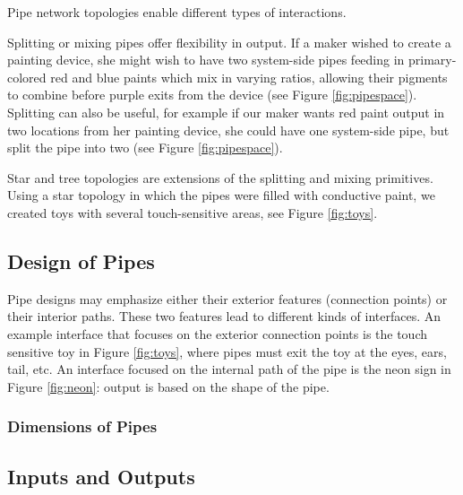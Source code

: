 Pipe network topologies enable different types of interactions.

Splitting or mixing pipes offer flexibility in output.  If a maker wished to create a painting device, she might wish to have two system-side pipes feeding in primary-colored red and blue paints which mix in varying ratios, allowing their pigments to combine before purple exits from the device (see Figure \ref{fig:pipespace}).  Splitting can also be useful, for example if our maker wants red paint output in two locations from her painting device, she could have one system-side pipe, but split the pipe into two (see Figure \ref{fig:pipespace}). 

Star and tree topologies are extensions of the splitting and mixing primitives.  Using a star topology in which the pipes were filled with conductive paint, we created toys with several touch-sensitive areas, see Figure \ref{fig:toys}. 

\subsection{Design of Pipes}

Pipe designs may emphasize either their exterior features (connection points) or their interior paths.  These two features lead to different kinds of interfaces.  An example interface that focuses on the exterior connection points is the touch sensitive toy in Figure \ref{fig:toys}, where pipes must exit the toy at the eyes, ears, tail, etc.  An interface focused on the internal path of the pipe is the neon sign in Figure \ref{fig:neon}: output is based on the shape of the pipe.

\subsubsection{Dimensions of Pipes}


\subsection{Inputs and Outputs}

